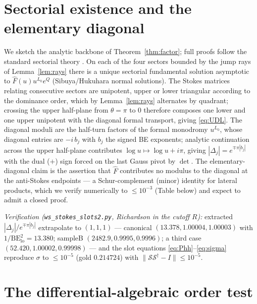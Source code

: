 \documentclass[11pt]{article}
\theoremstyle{definition}
\theoremstyle{remark}
\newcommand{\Scat}{\mathcal{S}}
\newcommand{\lo}{\mathrm{lo}}
\begin{document}
\appendix

\section{Sectorial existence and the elementary diagonal}\label{app:sectorial}

We sketch the analytic backbone of Theorem~\ref{thm:factor}; full proofs follow the standard
sectorial theory \cite{Wasow1965,LR2016}. On each of the four sectors bounded by the jump
rays of Lemma~\ref{lem:rays} there is a unique sectorial fundamental solution asymptotic to
$\hat F(u)u^{L_0}e^{Q}$ (Sibuya/Hukuhara normal solutions). The Stokes matrices relating
consecutive sectors are unipotent, upper or lower triangular according to the dominance order,
which by Lemma~\ref{lem:rays} alternates by quadrant; crossing the upper half-plane from
$\theta=\pi$ to $0$ therefore composes one lower and one upper unipotent with the diagonal
formal transport, giving \eqref{eq:UDL}. The diagonal moduli are the half-turn factors of the
formal monodromy $u^{L_0}$, whose diagonal entries are $-i\,b_j$ with $b_j$ the signed BE
exponents; analytic continuation across the upper half-plane contributes $\log u\mapsto\log
u+i\pi$, giving $|\Delta_j|=e^{\mp\pi|b_j|}$ with the dual ($+$) sign forced on the last Gauss
pivot by $\det$. The elementary-diagonal claim is the assertion that $\hat F$ contributes no
modulus to the diagonal at the anti-Stokes endpoints --- a Schur-complement (minor) identity
for lateral products, which we verify numerically to $\le10^{-3}$ (Table below) and expect to
admit a closed proof.

\smallskip
\noindent\emph{Verification (\texttt{ws\_stokes\_slots2.py}, Richardson in the cutoff $R$):}
extracted $|\Delta_j|/e^{\mp\pi|b_j|}$ extrapolate to $(1,1,1)$ ---
canonical $(13.378,1.00004,1.00003)$ with $1/\mathrm{BE}_\lo^2=13.380$;
sampleB $(2482.9,0.9995,0.9996)$; a third case $(52.420,1.00002,0.99998)$ ---
and the slot equations \eqref{eq:Phh}--\eqref{eq:sigma} reproduce $\sigma$ to
$\le10^{-5}$ (gold $0.214724$) with $\|\Scat\Scat^\dagger-I\|\le10^{-5}$.

\section{The differential-algebraic order test}\label{app:da}
\end{document}
